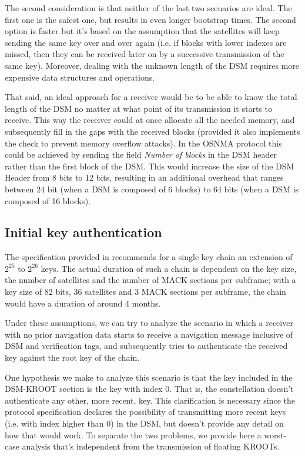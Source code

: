 The second consideration is that neither of the last two scenarios are ideal.
The first one is the safest one, but results in even longer bootstrap times. The
second option is faster but it's based on the assumption that the satellites
will keep sending the same key over and over again (i.e. if blocks with lower
indexes are missed, then they can be received later on by a successive
transmission of the same key). Moreover, dealing with the unknown length of the
DSM requires more expensive data structures and operations.

That said, an ideal approach for a receiver would be to be able to know the
total length of the DSM no matter at what point of its transmission it starts to
receive. This way the receiver could at once allocate all the needed memory, and
subsequently fill in the gaps with the received blocks (provided it also
implements the check to prevent memory overflow attacks). In the OSNMA protocol
this could be achieved by sending the field \textit{Number of blocks} in the DSM
header rather than the first block of the DSM. This would increase the size of
the DSM Header from 8 bits to 12 bits, resulting in an additional overhead that
ranges between 24 bit (when a DSM is composed of 6 blocks) to 64 bits (when a
DSM is composed of 16 blocks).

\subsection{Initial key authentication}
The specification provided in \cite{osnma} recommends for a single key chain
an extension of $2^{25}$ to $2^{26}$ keys. The actual duration of such a chain
is dependent on the key size, the number of satellites and the number of MACK
sections per subframe; with a key size of 82 bits, 36 satellites and 3 MACK
sections per subframe, the chain would have a duration of around 4 months.

Under these assumptions, we can try to analyze the scenario in which a receiver
with no prior navigation data starts to receive a navigation message inclusive
of DSM and verification tags, and subsequently tries to authenticate the
received key against the root key of the chain.

One hypothesis we make to analyze this scenario is that the key included in the
DSM-KROOT section is the key with index $0$. That is, the constellation doesn't
authenticate any other, more recent, key. This clarification is necessary since
the protocol specification declares the possibility of transmitting more recent
keys (i.e. with index higher than $0$) in the DSM, but doesn't provide any
detail on how that would work. To separate the two problems, we provide here a
worst-case analysis that's independent from the transmission of floating KROOTs.

